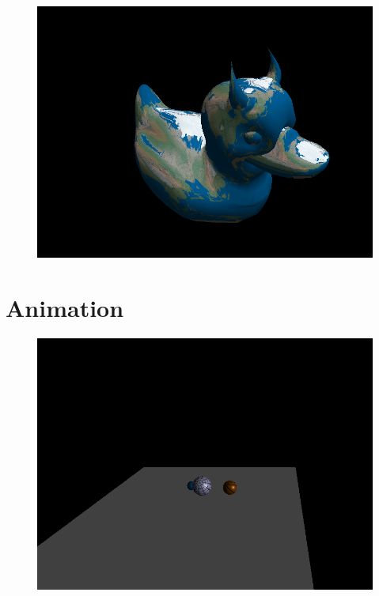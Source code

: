 \documentclass{beamer}
\begin{document}
\begin{frame}
	\begin{figure}
		\includegraphics[height=.9\textheight]{screen_2015-03-25_12:10:25}
	\end{figure}
\end{frame}

\section{Animation}
\begin{frame}
	\begin{figure}
		\includegraphics[height=.9\textheight]{screen_2015-03-25_12:04:03}
	\end{figure}
\end{frame}
\end{document}
